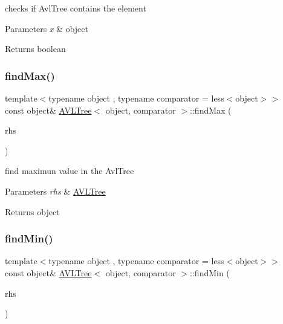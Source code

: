 checks if Avl\+Tree contains the element 


\begin{DoxyParams}{Parameters}
{\em x} & object \\
\hline
\end{DoxyParams}
\begin{DoxyReturn}{Returns}
boolean 
\end{DoxyReturn}
\hypertarget{class_a_v_l_tree_a72e12a134186842a034ee0e9c6a59ed6}{}\label{class_a_v_l_tree_a72e12a134186842a034ee0e9c6a59ed6} 
\subsubsection{\texorpdfstring{find\+Max()}{findMax()}}
{\footnotesize\ttfamily template$<$typename object , typename comparator  = less$<$object$>$$>$ \\
const object\& \hyperlink{class_a_v_l_tree}{A\+V\+L\+Tree}$<$ object, comparator $>$\+::find\+Max (\begin{DoxyParamCaption}\item[{const \hyperlink{class_a_v_l_tree}{A\+V\+L\+Tree}$<$ object, comparator $>$ \&}]{rhs }\end{DoxyParamCaption})\hspace{0.3cm}{\ttfamily [inline]}}



find maximun value in the Avl\+Tree 


\begin{DoxyParams}{Parameters}
{\em rhs} & \hyperlink{class_a_v_l_tree}{A\+V\+L\+Tree} \\
\hline
\end{DoxyParams}
\begin{DoxyReturn}{Returns}
object 
\end{DoxyReturn}
\hypertarget{class_a_v_l_tree_abb8296a20c0ab3fc8b172cb8c566cbd4}{}\label{class_a_v_l_tree_abb8296a20c0ab3fc8b172cb8c566cbd4} 
\subsubsection{\texorpdfstring{find\+Min()}{findMin()}}
{\footnotesize\ttfamily template$<$typename object , typename comparator  = less$<$object$>$$>$ \\
const object\& \hyperlink{class_a_v_l_tree}{A\+V\+L\+Tree}$<$ object, comparator $>$\+::find\+Min (\begin{DoxyParamCaption}\item[{const \hyperlink{class_a_v_l_tree}{A\+V\+L\+Tree}$<$ object, comparator $>$ \&}]{rhs }\end{DoxyParamCaption})\hspace{0.3cm}{\ttfamily [inline]}}



